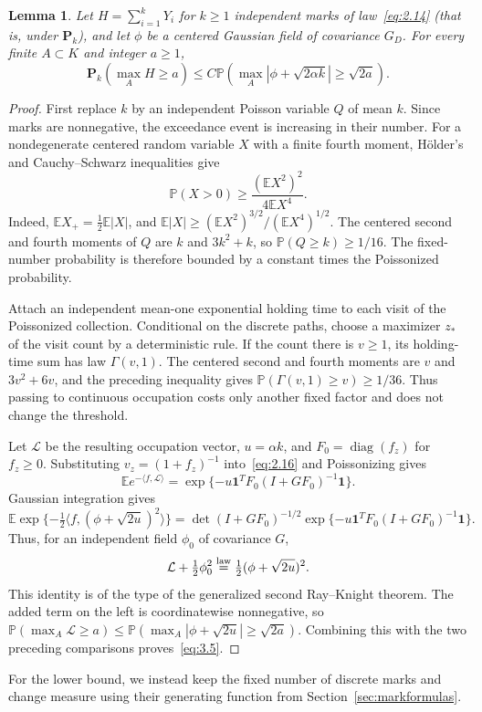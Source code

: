 \documentclass[11pt,letterpaper,reqno]{amsart}
\newif\ifrevmarks \revmarkstrue
\newcommand{\add}[1]{\ifrevmarks\textcolor{revorange}{#1}\else#1\fi}
\numberwithin{equation}{section}
\newtheorem{lemma}[theorem]{Lemma}
\theoremstyle{remark}
\begin{document}
\begin{lemma}\label{lem:oneway}
Let $H=\sum_{i=1}^kY_i$ for $k\ge1$ independent marks of law~\eqref{eq:2.14}\add{ (that is, under $\mathbf P_k$)}, and let $\phi$ be a centered Gaussian field of covariance $G_D$. For every finite $A\subset K$ and integer $a\ge1$,
\begin{equation}\label{eq:3.5}
\mathbf P_k(\max_AH\ge a)
\le C\mathbb P\left(\max_A|\phi+\sqrt{2\alpha k}|\ge\sqrt{2a}\right).
\end{equation}
\end{lemma}
\begin{proof}
First replace $k$ by an independent Poisson variable $Q$ of mean $k$. Since marks are nonnegative, the exceedance event is increasing in their number. For a nondegenerate centered random variable $X$ with a finite fourth moment, H\"older's and Cauchy--Schwarz inequalities give
\[
\mathbb P(X>0)\ge
\frac{(\mathbb E X^2)^2}{4\mathbb E X^4}.
\]
Indeed, $\mathbb E X_+=\tfrac12\mathbb E|X|$, and
$\mathbb E|X|\ge(\mathbb E X^2)^{3/2}/(\mathbb E X^4)^{1/2}$.
The centered second and fourth moments of $Q$ are $k$ and $3k^2+k$, so $\mathbb P(Q\ge k)\ge1/16$. The fixed-number probability is therefore bounded by a constant times the Poissonized probability.

Attach an independent mean-one exponential holding time to each visit of the Poissonized collection. Conditional on the discrete paths, choose a maximizer $z_*$ of the visit count by a deterministic rule. If the count there is $v\ge1$, its holding-time sum has law $\Gamma(v,1)$. The centered second and fourth moments are $v$ and $3v^2+6v$, and the preceding inequality gives $\mathbb P(\Gamma(v,1)\ge v)\ge1/36$. Thus passing to continuous occupation costs only another fixed factor and does not change the threshold.

Let $\mathcal L$ be the resulting occupation vector, $u=\alpha k$, and $F_0=\operatorname{diag}(f_z)$ for $f_z\ge0$. Substituting $v_z=(1+f_z)^{-1}$ into~\eqref{eq:2.16} and Poissonizing gives
\begin{equation}\label{eq:3.6}
\mathbb E e^{-\langle f,\mathcal L\rangle}
=\exp\{-u\mathbf1^TF_0(I+GF_0)^{-1}\mathbf1\}.
\end{equation}
Gaussian integration gives
\[
\mathbb E\exp\{-\tfrac12\langle f,(\phi+\sqrt{2u})^2\rangle\}
=\det(I+GF_0)^{-1/2}
\exp\{-u\mathbf1^TF_0(I+GF_0)^{-1}\mathbf1\}.
\]
Thus, for an independent field $\phi_0$ of covariance $G$,
\begin{equation}\label{eq:3.7}
\mathcal L+\tfrac12\phi_0^2
\overset{\rm law}=\tfrac12(\phi+\sqrt{2u})^2.
\end{equation}
\add{This identity is of the type of the generalized second Ray--Knight theorem.} The added term on the left is coordinatewise nonnegative\add{, so $\mathbb P(\max_A\mathcal L\ge a)\le\mathbb P(\max_A|\phi+\sqrt{2u}|\ge\sqrt{2a})$}. Combining this with the two preceding comparisons proves~\eqref{eq:3.5}.
\end{proof}
For the lower bound, we instead keep the fixed number of discrete marks and change measure using their generating function from Section~\ref{sec:markformulas}.
\end{document}
